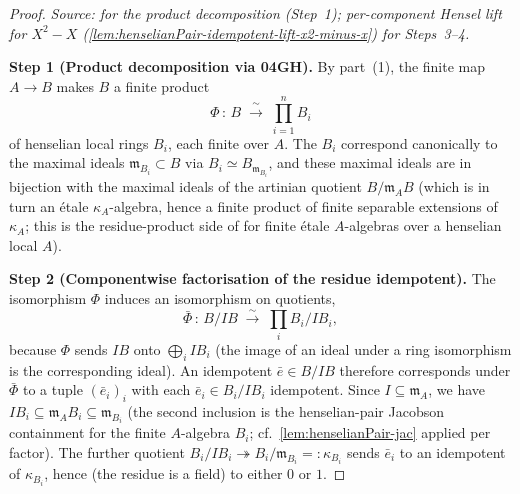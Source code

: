 \begin{proof}
\textit{Source:  for the product decomposition
(Step~1); per-component Hensel lift for $X^2 - X$
(\cref{lem:henselianPair-idempotent-lift-x2-minus-x}) for
Steps~3--4.}

\textbf{Step 1 (Product decomposition via 04GH).}
By  part~(1), the finite map $A \to B$ makes
$B$ a finite product
\[
\Phi\,:\,B \;\xrightarrow{\,\sim\,}\; \prod_{i = 1}^{n} B_i
\]
of henselian local rings $B_i$, each finite over $A$. The
$B_i$ correspond canonically to the maximal ideals
$\mathfrak m_{B_i} \subset B$ via
$B_i \simeq B_{\mathfrak m_{B_i}}$, and these maximal ideals are in
bijection with the maximal ideals of the artinian quotient
$B / \mathfrak m_A B$ (which is in turn an étale $\kappa_A$-algebra,
hence a finite product of finite separable extensions of $\kappa_A$;
this is the residue-product side of  for finite
étale $A$-algebras over a henselian local $A$).

\textbf{Step 2 (Componentwise factorisation of the residue idempotent).}
The isomorphism $\Phi$ induces an isomorphism on quotients,
\[
\bar\Phi\,:\,B / IB \;\xrightarrow{\,\sim\,}\; \prod_{i} B_i / IB_i,
\]
because $\Phi$ sends $IB$ onto $\bigoplus_i IB_i$ (the image of an
ideal under a ring isomorphism is the corresponding ideal). An
idempotent $\bar e \in B/IB$ therefore corresponds under
$\bar\Phi$ to a tuple $(\bar e_i)_{i}$ with each
$\bar e_i \in B_i / IB_i$ idempotent. Since $I \subseteq
\mathfrak m_A$, we have $IB_i \subseteq \mathfrak m_A B_i \subseteq
\mathfrak m_{B_i}$ (the second inclusion is the henselian-pair
Jacobson containment for the finite $A$-algebra $B_i$;
cf.\ \cref{lem:henselianPair-jac} applied per factor). The further
quotient $B_i / IB_i \twoheadrightarrow B_i / \mathfrak m_{B_i}
=: \kappa_{B_i}$ sends $\bar e_i$ to an idempotent of
$\kappa_{B_i}$, hence (the residue is a field) to either $0$ or $1$.


\end{proof}
